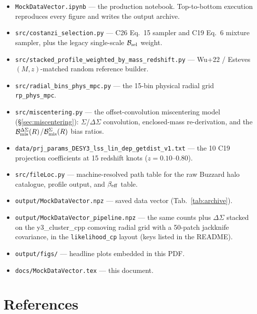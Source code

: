 \documentclass[a4paper, 11pt]{article}
\newcommand{\Bsel}{\mathcal{B}_{\rm sel}}
\newcommand{\Bmis}{\mathcal{B}_{\rm mis}}
\newcommand{\blk}[1]{\textcolor{datablockcol}{\texttt{#1}}}
\newcommand{\pyfile}[1]{{\small\texttt{#1}}}
\begin{document}
\begin{itemize}
  \setlength\itemsep{1pt}
  \item \pyfile{MockDataVector.ipynb} --- the production notebook.
    Top-to-bottom execution reproduces every figure and writes the
    output archive.
  \item \pyfile{src/costanzi\_selection.py} --- C26 Eq.~15 sampler and
    C19 Eq.~6 mixture sampler, plus the legacy single-scale $\Bsel$
    weight.
  \item \pyfile{src/stacked\_profile\_weighted\_by\_mass\_redshift.py} ---
    Wu+22 / Esteves $(M, z)$-matched random reference builder.
  \item \pyfile{src/radial\_bins\_phys\_mpc.py} --- the 15-bin physical
    radial grid \blk{rp\_phys\_mpc}.
  \item \pyfile{src/miscentering.py} --- the offset-convolution
    miscentering model (\S\ref{sec:miscentering}): $\Sigma$/$\Delta\Sigma$
    convolution, enclosed-mass re-derivation, and the
    $\Bmis^{\Delta\Sigma}(R)$/$\Bmis^{\Sigma}(R)$ bias ratios.
  \item \pyfile{data/prj\_params\_DESY3\_lss\_lin\_dep\_getdist\_v1.txt}
    --- the 10 C19 projection coefficients at 15 redshift knots
    ($z = 0.10$--$0.80$).
  \item \pyfile{src/fileLoc.py} --- machine-resolved path table for the
    raw Buzzard halo catalogue, profile output, and $\beta_{\rm eff}$
    table.
  \item \pyfile{output/MockDataVector.npz} --- saved data vector
    (Tab.~\ref{tab:archive}).
  \item \pyfile{output/MockDataVector\_pipeline.npz} --- the same counts
    plus $\Delta\Sigma$ stacked on the y3\_cluster\_cpp comoving radial
    grid with a 50-patch jackknife covariance, in the
    \texttt{likelihood\_cp} layout (keys listed in the README).
  \item \pyfile{output/figs/} --- headline plots embedded in this PDF.
  \item \pyfile{docs/MockDataVector.tex} --- this document.
\end{itemize}

\section{References}
\label{sec:refs}
\end{document}
